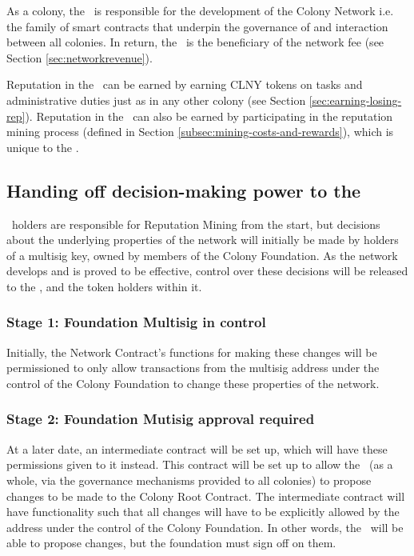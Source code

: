 As a colony, the \rc\ is responsible for the development of the Colony Network i.e. the family of smart contracts that underpin the governance of and interaction between all colonies. In return, the \rc\ is the beneficiary of the network fee (see Section \ref{sec:networkrevenue}).

Reputation in the \rc\ can be earned by earning CLNY tokens on tasks and administrative duties just as in any other colony (see Section \ref{sec:earning-losing-rep}). Reputation in the \rc\ can also be earned by participating in the reputation mining process (defined in Section \ref{subsec:mining-costs-and-rewards}), which is unique to the \rc.

\subsection{Handing off decision-making power to the \rc}\label{subsec:ceding-control-to-rc}
\rct\ holders are responsible for Reputation Mining from the start, but decisions about the underlying properties of the network will initially be made by holders of a multisig key, owned by members of the Colony Foundation. As the network develops and is proved to be effective, control over these decisions will be released to the \rc, and the token holders within it.

\subsubsection*{Stage 1: Foundation Multisig in control}
Initially, the Network Contract's functions for making these changes will be permissioned to only allow transactions from the multisig address under the control of the Colony Foundation to change these properties of the network. 

\subsubsection*{Stage 2: Foundation Mutisig approval required}
At a later date, an intermediate contract will be set up, which will have these permissions given to it instead. This contract will be set up to allow the \rc\ (as a whole, via the governance mechanisms provided to all colonies) to propose changes to be made to the Colony Root Contract. The intermediate contract will have functionality such that all changes will have to be explicitly allowed by the address under the control of the Colony Foundation. In other words, the \rc\ will be able to propose changes, but the foundation must sign off on them.

